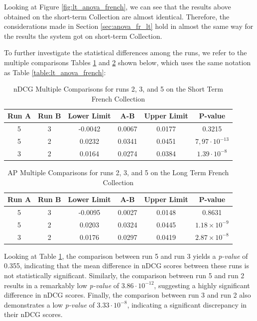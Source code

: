 Looking at Figure \ref{fig:lt_anova_french}, we can see that the results above obtained on the short-term Collection are almost identical.
Therefore, the considerations made in Section \ref{sec:anova_fr_lt} hold in almost the same way for the results the system got on short-term Collection.

To further investigate the statistical differences among the runs, we refer to the multiple comparisons Tables \ref{table:st_anova_french} and \ref{table:st_anova_french_ap} shown below, which uses the same notation as Table \ref{table:lt_anova_french}:

\begin{table}[!h]
    \centering
    \caption{\ac{nDCG} Multiple Comparisons for runs 2, 3, and 5 on the Short Term French Collection}
    \label{table:st_anova_french}
    \begin{tabular}{cccccc}
    \hline
    Run A & Run B & Lower Limit & A-B & Upper Limit & P-value \\ \hline
    5 & 3 & -0.0042 & 0.0067 & 0.0177 & 0.3215 \\
    5 & 2 & 0.0232 & 0.0341 & 0.0451 & $7,97 \cdot 10^{-13}$ \\
    3 & 2 & 0.0164 & 0.0274 & 0.0384 & $1.39 \cdot 10^{-8}$ \\ \hline
    \end{tabular}
\end{table}

\begin{table}[!h]
    \centering
    \caption{\ac{AP} Multiple Comparisons for runs 2, 3, and 5 on the Long Term French Collection}
    \label{table:st_anova_french_ap}
    \begin{tabular}{cccccc}
    \hline
    Run A & Run B & Lower Limit & A-B & Upper Limit & P-value \\ \hline
    5 & 3 & -0.0095 & 0.0027 & 0.0148 & 0.8631 \\
    5 & 2 & 0.0203 & 0.0324 & 0.0445 & $1.18 \times 10^{-9}$ \\
    3 & 2 & 0.0176 & 0.0297 & 0.0419 & $2.87 \times 10^{-8}$ \\ \hline
    \end{tabular}
\end{table}

Looking at Table \ref{table:st_anova_french}, the comparison between run 5 and run 3 yields a \textit{p-value} of 0.355, indicating that the mean difference in \ac{nDCG} scores between these runs is not statistically significant.
Similarly, the comparison between run 5 and run 2 results in a remarkably low \textit{p-value} of $3.86 \cdot 10^{-12}$, suggesting a highly significant difference in \ac{nDCG} scores.
Finally, the comparison between run 3 and run 2 also demonstrates a low \textit{p-value} of $3.33 \cdot 10^{-8}$, indicating a significant discrepancy in their \ac{nDCG} scores.

